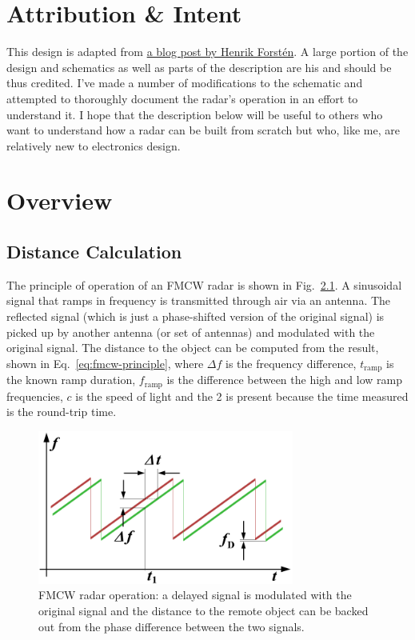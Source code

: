 \documentclass{default}
\begin{document}
\tableofcontents
\hypersetup{linkcolor=red}

\chapter{Attribution \& Intent}
\label{cha:attribution}

This design is adapted from
\href{http://hforsten.com/third-version-of-homemade-6-ghz-fmcw-radar.html}{a blog post by Henrik
  Forst\'en}. A large portion of the design and schematics as well as parts of the description are
his and should be thus credited. I've made a number of modifications to the schematic and attempted
to thoroughly document the radar's operation in an effort to understand it. I hope that the
description below will be useful to others who want to understand how a radar can be built from
scratch but who, like me, are relatively new to electronics design.

\chapter{Overview}
\label{cha:overview}

\section{Distance Calculation}
\label{sec:distance}

The principle of operation of an FMCW radar is shown in Fig.~\ref{fig:fmcw-principle}. A sinusoidal
signal that ramps in frequency is transmitted through air via an antenna. The reflected signal
(which is just a phase-shifted version of the original signal) is picked up by another antenna (or
set of antennas) and modulated with the original signal. The distance to the object can be computed
from the result, shown in Eq.~\ref{eq:fmcw-principle}, where $\Delta f$ is the frequency difference,
$t_{\text{ramp}}$ is the known ramp duration, $f_{\text{ramp}}$ is the difference between the high
and low ramp frequencies, $c$ is the speed of light and the 2 is present because the time measured
is the round-trip time.

\begin{figure}[h]
        \centering
        \includegraphics[width=0.75\textwidth]{data/fmcw-principle}
        \caption{FMCW radar operation: a delayed signal is modulated with the original signal and
          the distance to the remote object can be backed out from the phase difference between the
          two signals.}
        \label{fig:fmcw-principle}
\end{figure}
\end{document}
